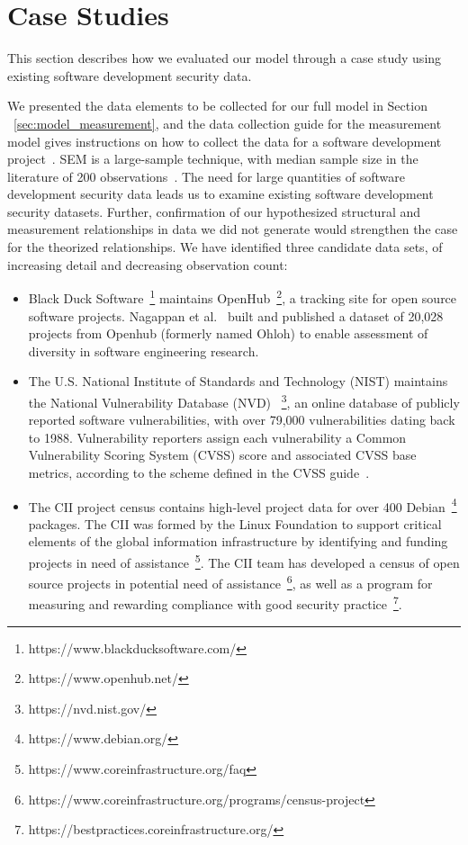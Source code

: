 \section{Case Studies}
\label{sec:evaluation}
This section describes how we evaluated our model through a case study using existing software development security data.

We presented the data elements to be collected for our full model in Section ~\ref{sec:model_measurement}, and the data collection guide for the measurement model gives instructions on how to collect the data for a software development project~\cite{morrison2016spefsite}. SEM is a large-sample technique, with median sample size in the literature of 200 observations~\cite{kline2015principles}. The need for large quantities of software development security data leads us to examine existing software development security datasets. Further, confirmation of our hypothesized structural and measurement relationships in data we did not generate would strengthen the case for the theorized relationships.
We have identified three candidate data sets, of increasing detail and decreasing observation count:
\begin{itemize}
\item Black Duck Software~\footnote{https://www.blackducksoftware.com/} maintains OpenHub~\footnote{https://www.openhub.net/}, a tracking site for open source software projects. Nagappan et al.~\cite{nagappan2013diversity} built and published a dataset of 20,028 projects from Openhub (formerly named Ohloh) to enable assessment of diversity in software engineering research. 
\item The U.S. National Institute of Standards and Technology (NIST) maintains the National Vulnerability Database (NVD) ~\footnote{https://nvd.nist.gov/}, an online database of publicly reported software vulnerabilities, with over 79,000 vulnerabilities dating back to 1988. Vulnerability reporters assign each vulnerability a Common Vulnerability Scoring System (CVSS) score and associated CVSS base metrics, according to the scheme defined in the CVSS guide~\cite{mell2007complete}.
\item The CII project census contains high-level project data for over 400 Debian~\footnote{https://www.debian.org/} packages. The CII was formed by the Linux Foundation to support critical elements of the global information infrastructure by identifying and funding projects in need of assistance~\footnote{https://www.coreinfrastructure.org/faq}. The CII team has developed a census of open source projects in potential need of assistance~\footnote{https://www.coreinfrastructure.org/programs/census-project}, as well as a program for measuring and rewarding compliance with good security practice~\footnote{https://bestpractices.coreinfrastructure.org/}.
\end{itemize}

